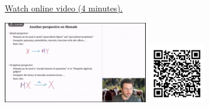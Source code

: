 
\begin{minipage}{10cm}
    \href{https://act4e-spring21.netlify.app/videos/spring2021-monads-b:formal-expressions.html}{Watch online video (4 minutes).}
        
    \href{https://act4e-spring21.netlify.app/videos/spring2021-monads-b:formal-expressions.html}{\includegraphics[height=3.5cm]{spring2021-monads-b:formal-expressions/thumbnails.jpg}}
    \href{https://act4e-spring21.netlify.app/videos/spring2021-monads-b:formal-expressions.html}{\includegraphics[height=2.5cm]{spring2021-monads-b:formal-expressions/qrcode.png}}
\end{minipage}
